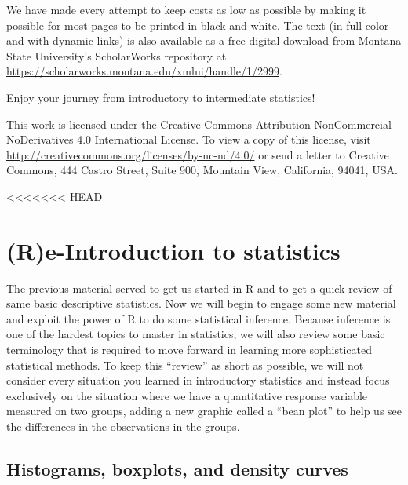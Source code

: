 \documentclass[]{book}
\theoremstyle{definition}
\theoremstyle{definition}
\theoremstyle{remark}
\begin{document}
We have made every attempt to keep costs as low as possible by making it
possible for most pages to be printed in black and white. The text (in
full color and with dynamic links) is also available as a free digital
download from Montana State University's ScholarWorks repository at
\url{https://scholarworks.montana.edu/xmlui/handle/1/2999}.

Enjoy your journey from introductory to intermediate statistics!

This work is licensed under the Creative Commons
Attribution-NonCommercial-NoDerivatives 4.0 International License. To
view a copy of this license, visit
\url{http://creativecommons.org/licenses/by-nc-nd/4.0/} or send a letter
to Creative Commons, 444 Castro Street, Suite 900, Mountain View,
California, 94041, USA.

<<<<<<< HEAD
\chapter{(R)e-Introduction to statistics}\label{chapter2}

The previous material served to get us started in R and to get a quick
review of same basic descriptive statistics. Now we will begin to engage
some new material and exploit the power of R to do some statistical
inference. Because inference is one of the hardest topics to master in
statistics, we will also review some basic terminology that is required
to move forward in learning more sophisticated statistical methods. To
keep this ``review'' as short as possible, we will not consider every
situation you learned in introductory statistics and instead focus
exclusively on the situation where we have a quantitative response
variable measured on two groups, adding a new graphic called a ``bean
plot'' to help us see the differences in the observations in the groups.

\section{Histograms, boxplots, and density curves}\label{section2-1}
\end{document}
